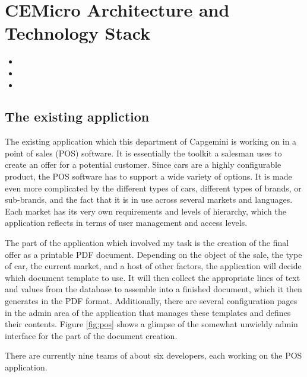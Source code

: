 \chapter{CEMicro Architecture and Technology Stack}
\label{sec:arch}

\begin{itemize}
  \item {}
  \item {}
  \item {}
\end{itemize}


\section{The existing appliction}

The existing application which this department of Capgemini is working on in a point of sales (POS) software. It is essentially the toolkit a salesman uses to create an offer for a potential customer. Since cars are a highly configurable product, the POS software has to support a wide variety of options. It is made even more complicated by the different types of cars, different types of brands, or sub-brands, and the fact that it is in use across several markets and languages. Each market has its very own requirements and levels of hierarchy, which the application reflects in terms of user management and access levels.

The part of the application which involved my task is the creation of the final offer as a printable PDF document. Depending on the object of the sale, the type of car, the current market, and a host of other factors, the application will decide which document template to use. It will then collect the appropriate lines of text and values from the database to assemble into a finished document, which it then generates in the PDF format. Additionally, there are several configuration pages in the admin area of the application that manages these templates and defines their contents. Figure \ref{fig:pos} shows a glimpse of the somewhat unwieldy admin interface for the part of the document creation.

There are currently nine teams of about six developers, each working on the POS application.

